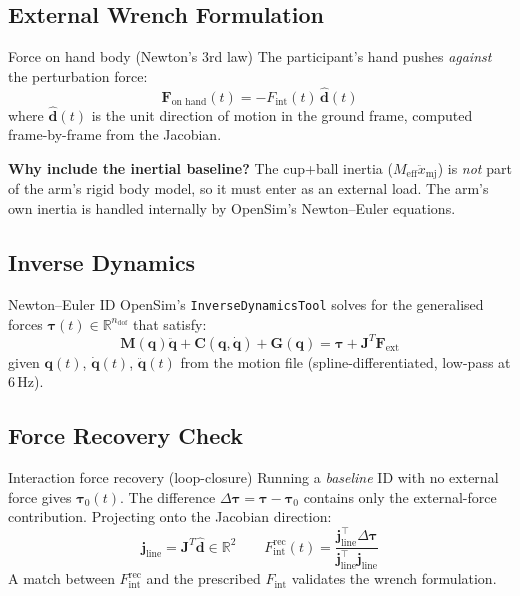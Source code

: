 \documentclass[11pt,a4paper]{article}
\newcommand{\R}{\mathbb{R}}
\newcommand{\btau}{\bm{\tau}}
\newcommand{\bq}{\bm{q}}
\begin{document}
\subsection{External Wrench Formulation}

\begin{eqbox}{Force on hand body (Newton's 3rd law)}
The participant's hand pushes \emph{against} the perturbation force:
\begin{equation}
\bm{F}_\text{on hand}(t) = -F_\text{int}(t)\,\hat{\bm{d}}(t)
\end{equation}
where $\hat{\bm{d}}(t)$ is the unit direction of motion in the ground frame,
computed frame-by-frame from the Jacobian.

\medskip
\textbf{Why include the inertial baseline?}
The cup+ball inertia ($M_\text{eff}\ddot{x}_\text{mj}$) is \emph{not} part of
the arm's rigid body model, so it must enter as an external load.
The arm's own inertia is handled internally by OpenSim's Newton--Euler equations.
\end{eqbox}

\subsection{Inverse Dynamics}

\begin{eqbox}{Newton--Euler ID}
OpenSim's \texttt{InverseDynamicsTool} solves for the generalised forces
$\btau(t) \in \R^{n_\text{dof}}$ that satisfy:
\begin{equation}
\bm{M}(\bq)\ddot{\bq} + \bm{C}(\bq,\dot{\bq}) + \bm{G}(\bq)
= \btau + \bm{J}^T\bm{F}_\text{ext}
\end{equation}
given $\bq(t)$, $\dot{\bq}(t)$, $\ddot{\bq}(t)$ from the motion file
(spline-differentiated, low-pass at 6\,Hz).
\end{eqbox}

\subsection{Force Recovery Check}

\begin{eqbox}{Interaction force recovery (loop-closure)}
Running a \emph{baseline} ID with no external force gives $\btau_0(t)$.
The difference $\Delta\btau = \btau - \btau_0$ contains only the external-force
contribution.  Projecting onto the Jacobian direction:
\begin{equation}
\bm{j}_\text{line} = \bm{J}^T\hat{\bm{d}} \in \R^2
\qquad
F_\text{int}^\text{rec}(t)
  = \frac{\bm{j}_\text{line}^\top \Delta\btau}
         {\bm{j}_\text{line}^\top \bm{j}_\text{line}}
\end{equation}
A match between $F_\text{int}^\text{rec}$ and the prescribed $F_\text{int}$
validates the wrench formulation.
\end{eqbox}
\end{document}
